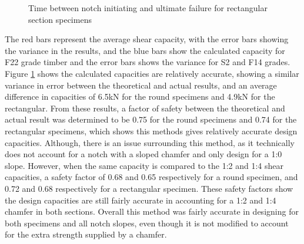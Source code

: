 \documentclass[11pt,a4paper]{article}
\numberwithin{equation}{subsection}
\begin{document}
\vspace*{\baselineskip}

\begin{figure}[h]
	\begin{center}
	\end{center}
	\caption{Time between notch initiating and ultimate failure for rectangular section specimens}
	\label{fig:Shear_Des}
\end{figure}

\noindent
The red bars represent the average shear capacity, with the error bars showing the variance in the results, and the blue bars show the calculated capacity for F22 grade timber and the error bars shows the variance for S2 and F14 grades. Figure \ref{fig:Shear_Des} shows the calculated capacities are relatively accurate, showing a similar variance in error between the theoretical and actual results, and an average difference in capacities of 6.5kN for the round specimens and 4.9kN for the rectangular. From these results, a factor of safety between the theoretical and actual result was determined to be 0.75 for the round specimens and 0.74 for the rectangular specimens, which shows this methods gives relatively accurate design capacities. Although, there is an issue surrounding this method, as it technically does not account for a notch with a sloped chamfer and only design for a 1:0 slope. However, when the same capacity is compared to the 1:2 and 1:4 shear capacities, a safety factor of 0.68 and 0.65 respectively for a round specimen, and 0.72 and 0.68 respectively for a rectangular specimen. These safety factors show the design capacities are still fairly accurate in accounting for a 1:2 and 1:4 chamfer in both sections. Overall this method was fairly accurate in designing for both specimens and all notch slopes, even though it is not modified to account for the extra strength supplied by a chamfer. 
\end{document}
